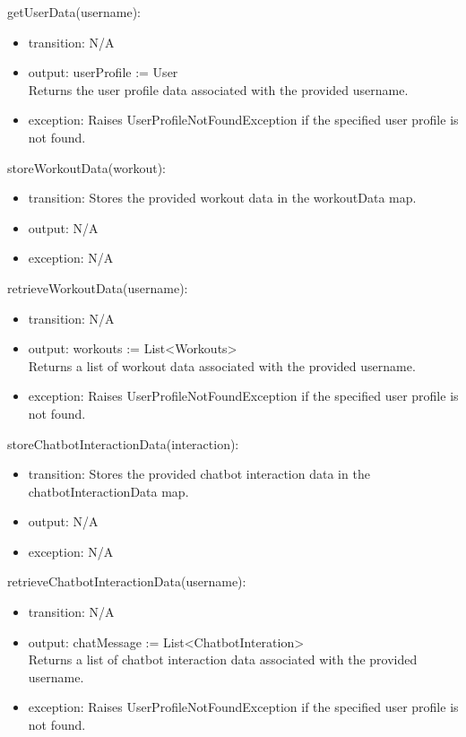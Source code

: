 \documentclass[12pt, titlepage]{article}
\begin{document}
\noindent getUserData(username):
\begin{itemize}
\item transition: N/A
\item output: userProfile := User \\
Returns the user profile data associated with the provided username.
\item exception: Raises UserProfileNotFoundException if the specified user profile is not found.
\end{itemize}

\noindent storeWorkoutData(workout):
\begin{itemize}
\item transition: Stores the provided workout data in the workoutData map.
\item output: N/A
\item exception: N/A
\end{itemize}

\noindent retrieveWorkoutData(username):
\begin{itemize}
\item transition: N/A
\item output: workouts := List\textless Workouts\textgreater\\
Returns a list of workout data associated with the provided username.
\item exception: Raises UserProfileNotFoundException if the specified user profile is not found.
\end{itemize}

\noindent storeChatbotInteractionData(interaction):
\begin{itemize}
\item transition: Stores the provided chatbot interaction data in the chatbotInteractionData map.
\item output: N/A
\item exception: N/A
\end{itemize}

\noindent retrieveChatbotInteractionData(username):
\begin{itemize}
\item transition: N/A
\item output: chatMessage := List\textless ChatbotInteration\textgreater\\
Returns a list of chatbot interaction data associated with the provided username.
\item exception: Raises UserProfileNotFoundException if the specified user profile is not found.
\end{itemize}
\end{document}
